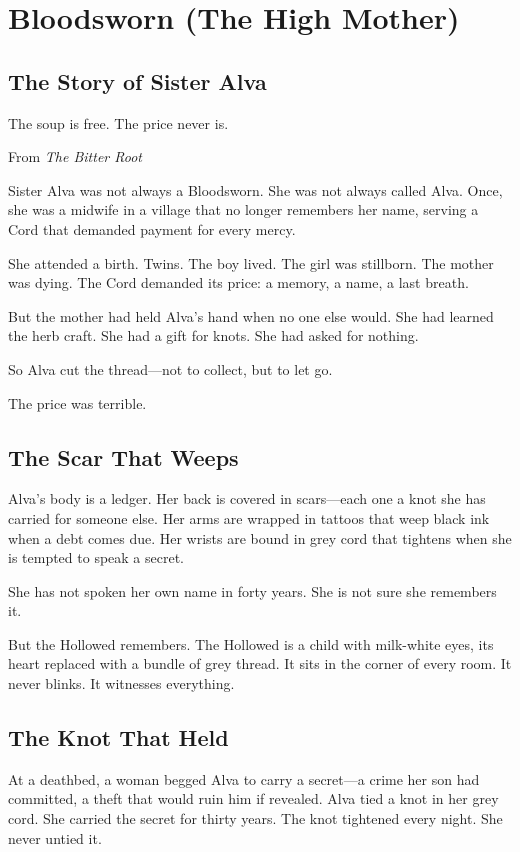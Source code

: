 \section{Bloodsworn (The High Mother)}

\subsection{The Story of Sister Alva}

\epigraph{The soup is free. The price never is.}{From \textit{The Bitter Root}}

Sister Alva was not always a Bloodsworn. She was not always called Alva. Once, she was a midwife in a village that no longer remembers her name, serving a Cord that demanded payment for every mercy.

She attended a birth. Twins. The boy lived. The girl was stillborn. The mother was dying. The Cord demanded its price: a memory, a name, a last breath.

But the mother had held Alva's hand when no one else would. She had learned the herb craft. She had a gift for knots. She had asked for nothing.

So Alva cut the thread—not to collect, but to let go.

The price was terrible.

\subsection{The Scar That Weeps}

Alva's body is a ledger. Her back is covered in scars—each one a knot she has carried for someone else. Her arms are wrapped in tattoos that weep black ink when a debt comes due. Her wrists are bound in grey cord that tightens when she is tempted to speak a secret.

She has not spoken her own name in forty years. She is not sure she remembers it.

But the Hollowed remembers. The Hollowed is a child with milk-white eyes, its heart replaced with a bundle of grey thread. It sits in the corner of every room. It never blinks. It witnesses everything.

\subsection{The Knot That Held}

At a deathbed, a woman begged Alva to carry a secret—a crime her son had committed, a theft that would ruin him if revealed. Alva tied a knot in her grey cord. She carried the secret for thirty years. The knot tightened every night. She never untied it.

